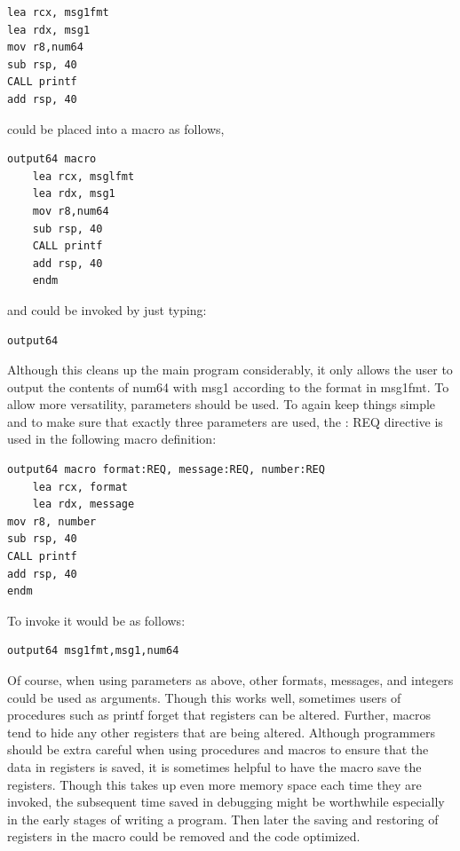 \documentclass[10pt]{book}
\begin{document}
\begin{verbatim}
lea rcx, msg1fmt
lea rdx, msg1
mov r8,num64
sub rsp, 40
CALL printf
add rsp, 40
\end{verbatim}

could be placed into a macro as follows,

\begin{verbatim}
output64 macro
    lea rcx, msglfmt
    lea rdx, msg1
    mov r8,num64
    sub rsp, 40
    CALL printf
    add rsp, 40
    endm
\end{verbatim}

and could be invoked by just typing:

\begin{verbatim}
output64
\end{verbatim}

Although this cleans up the main program considerably, it only allows the user to output the contents of num64 with msg1 according to the format in msg1fmt. To allow more versatility, parameters should be used. To again keep things simple and to make sure that exactly three parameters are used, the : REQ directive is used in the following macro definition:

\begin{verbatim}
output64 macro format:REQ, message:REQ, number:REQ
    lea rcx, format
    lea rdx, message
mov r8, number
sub rsp, 40
CALL printf
add rsp, 40
endm
\end{verbatim}

To invoke it would be as follows:

\begin{verbatim}
output64 msg1fmt,msg1,num64
\end{verbatim}

Of course, when using parameters as above, other formats, messages, and integers could be used as arguments. Though this works well, sometimes users of procedures such as printf forget that registers can be altered. Further, macros tend to hide any other registers that are being altered. Although programmers should be extra careful when using procedures and macros to ensure that the data in registers is saved, it is sometimes helpful to have the macro save the registers. Though this takes up even more memory space each time they are invoked, the subsequent time saved in debugging might be worthwhile especially in the early stages of writing a program. Then later the saving and restoring of registers in the macro could be removed and the code optimized.
\end{document}
